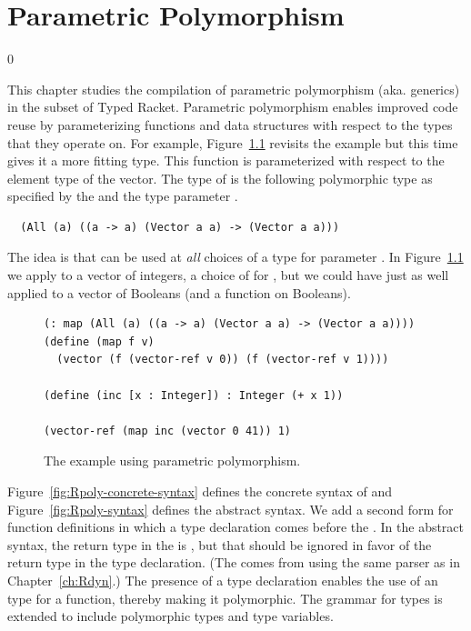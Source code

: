 \documentclass[7x10]{TimesAPriori_MIT}%
\def\racketEd{0}
\def\edition{1}
\begin{document}
\chapter{Parametric Polymorphism}
\label{ch:Rpoly}

\if\edition\racketEd

This chapter studies the compilation of parametric
polymorphism
(aka. generics) in the subset \LangPoly{} of Typed
Racket. Parametric polymorphism enables improved code reuse by
parameterizing functions and data structures with respect to the types
that they operate on. For example, Figure~\ref{fig:map-poly}
revisits the  example but this time gives it a more
fitting type.  This  function is parameterized with
respect to the element type of the vector. The type of 
is the following polymorphic type as specified by the  and
the type parameter .
\begin{lstlisting}
  (All (a) ((a -> a) (Vector a a) -> (Vector a a)))
\end{lstlisting}
The idea is that  can be used at \emph{all} choices of a
type for parameter . In Figure~\ref{fig:map-poly} we apply
 to a vector of integers, a choice of  for
, but we could have just as well applied  to a
vector of Booleans (and a function on Booleans).

\begin{figure}[tbp]
\begin{lstlisting}
(: map (All (a) ((a -> a) (Vector a a) -> (Vector a a))))
(define (map f v)
  (vector (f (vector-ref v 0)) (f (vector-ref v 1))))

(define (inc [x : Integer]) : Integer (+ x 1))

(vector-ref (map inc (vector 0 41)) 1)
\end{lstlisting}
\caption{The  example using parametric polymorphism.}
\label{fig:map-poly}
\end{figure}

Figure~\ref{fig:Rpoly-concrete-syntax} defines the concrete syntax of
\LangPoly{} and Figure~\ref{fig:Rpoly-syntax} defines the abstract
syntax. We add a second form for function definitions in which a type
declaration comes before the . In the abstract syntax,
the return type in the  is , but that should be
ignored in favor of the return type in the type declaration.  (The
 comes from using the same parser as in
Chapter~\ref{ch:Rdyn}.)  The presence of a type declaration
enables the use of an  type for a function, thereby making
it polymorphic. The grammar for types is extended to include
polymorphic types and type variables.
\end{document}
